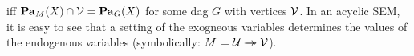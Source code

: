 iff $\mathop{\mathbf{Pa}}_M(X) \cap \mathcal V = \mathop{\mathbf{Pa}}_G(X)$ for some dag $G$ with vertices $\mathcal V$. 
In an acyclic SEM, it is easy to see that 
a setting of the exogneous variables determines the
values of the endogenous variables
(symbolically: $M \models \mathcal U \rightarrow\mathrel{\mspace{-15mu}}\rightarrow \mathcal V$).
